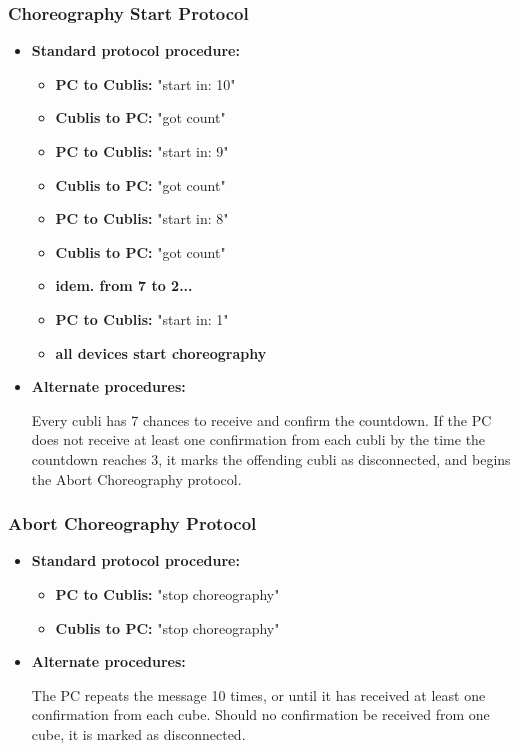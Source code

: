\subsubsection{Choreography Start Protocol}

\begin{itemize}
\item[] \textbf{Standard protocol procedure:}

\begin{itemize}
\item[] \textbf{PC to Cublis:} "start in: 10"
\item[] \textbf{Cublis to PC:} "got count"
\item[] \textbf{PC to Cublis:} "start in:  9"
\item[] \textbf{Cublis to PC:} "got count"
\item[] \textbf{PC to Cublis:} "start in:  8"
\item[] \textbf{Cublis to PC:} "got count"
\item[] \textbf{idem. from 7 to 2...}
\item[] \textbf{PC to Cublis:} "start in:  1"
\item[] \textbf{all devices start choreography}
\end{itemize}

\item[] \textbf{Alternate procedures:}

Every cubli has 7 chances to receive and confirm the countdown. If the PC does not receive at least one confirmation from each cubli by the time the countdown reaches 3, it marks the offending cubli as disconnected, and begins the Abort Choreography protocol.

\end{itemize}

\subsubsection{Abort Choreography Protocol}

\begin{itemize}
\item[] \textbf{Standard protocol procedure:}

\begin{itemize}
\item[] \textbf{PC to Cublis:} "stop choreography"
\item[] \textbf{Cublis to PC:} "stop choreography"
\end{itemize}

\item[] \textbf{Alternate procedures:}

The PC repeats the message 10 times, or until it has received at least one confirmation from each cube. Should no confirmation be received from one cube, it is marked as disconnected.

\end{itemize}

